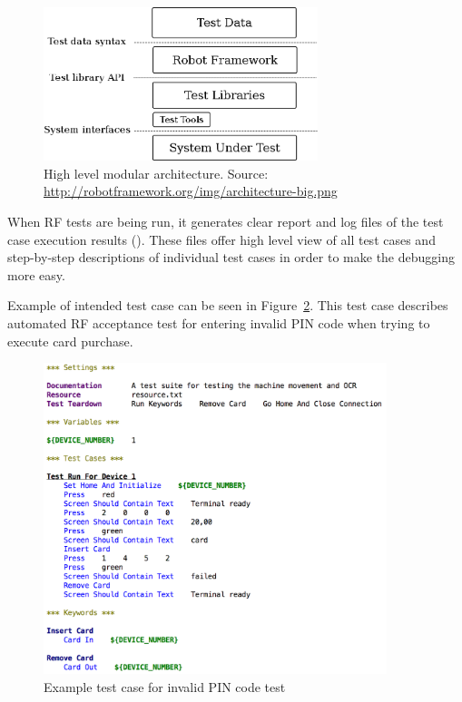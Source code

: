\begin{figure}[ht]
  \begin{center}
    \includegraphics[width=8cm]{images/architecture-big.png}
    \caption{High level modular architecture. Source: \url{http://robotframework.org/img/architecture-big.png}}
    \label{fig:modular_architecture}
  \end{center}
\end{figure}

When RF tests are being run, it generates clear report and log files of the test case execution results (\emph{\cite{Rfuserguide}}). These files offer high level view of all test cases and step-by-step descriptions of individual test cases in order to make the debugging more easy.

Example of intended test case can be seen in Figure~\ref{fig:invalid_pin_test}. This test case describes automated RF acceptance test for entering invalid PIN code when trying to execute card purchase.

\begin{figure}[ht]
  \begin{center}
    \includegraphics[width=10cm]{images/example_test.png}
    \caption{Example test case for invalid PIN code test}
    \label{fig:invalid_pin_test}
  \end{center}
\end{figure}

